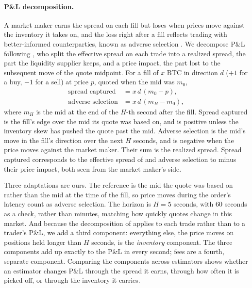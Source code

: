 \documentclass[11pt]{article}
\begin{document}
\paragraph{P\&L decomposition.}
A market maker earns the spread on each fill but loses when prices move against the inventory it
takes on, and the loss right after a fill reflects trading with better-informed counterparties, known as
adverse selection \citep{glostenmilgrom1985}. We decompose P\&L following \citet{hendershott2011}, who
split the effective spread on each trade into a realized spread, the part the liquidity supplier keeps,
and a price impact, the part lost to the subsequent move of the quote midpoint. For a fill of $x$ BTC in
direction $d$ ($+1$ for a buy, $-1$ for a sell) at price $p$, quoted when the mid was $m_0$,
\begin{align}
  \text{spread captured} &= x\, d\, (m_0 - p), \label{eq:spread_captured}\\
  \text{adverse selection} &= x\, d\, (m_H - m_0), \label{eq:adverse_selection}
\end{align}
where $m_H$ is the mid at the end of the $H$-th second after the fill. Spread captured is the fill's
edge over the mid its quote was based on, and is positive unless the inventory skew has pushed the quote
past the mid. Adverse selection is the mid's move in the fill's direction over the next $H$ seconds, and
is negative when the price moves against the market maker. Their sum is the realized spread. Spread
captured corresponds to the effective spread of \citet{hendershott2011} and adverse selection to minus
their price impact, both seen from the market maker's side.

Three adaptations are ours. The reference is the mid the quote was based on rather than the mid at the
time of the fill, so price moves during the order's latency count as adverse selection. The horizon is
$H = 5$ seconds, with 60 seconds as a check, rather than minutes, matching how quickly quotes change in
this market. And because the decomposition of \citet{hendershott2011} applies to each trade rather than
to a trader's P\&L, we add a third component: everything else, the price moves on positions held longer
than $H$ seconds, is the \emph{inventory} component. The three components add up exactly to the P\&L in
every second; fees are a fourth, separate component. Comparing the components across estimators shows
whether an estimator changes P\&L through the spread it earns, through how often it is picked off, or
through the inventory it carries.
\end{document}
